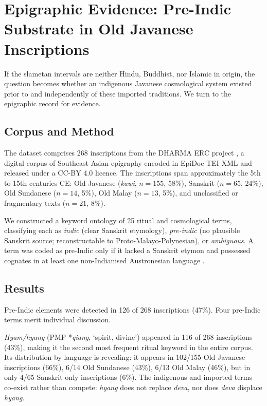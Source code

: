 \documentclass[12pt,a4paper]{article}
\begin{document}
\section{Epigraphic Evidence: Pre-Indic Substrate in Old Javanese Inscriptions}

If the slametan intervals are neither Hindu, Buddhist, nor Islamic in origin, the question becomes whether an indigenous Javanese cosmological system existed prior to and independently of these imported traditions. We turn to the epigraphic record for evidence.

\subsection{Corpus and Method}

The dataset comprises 268 inscriptions from the DHARMA ERC project \citep{griffiths_2020}, a digital corpus of Southeast Asian epigraphy encoded in EpiDoc TEI-XML and released under a CC-BY 4.0 licence. The inscriptions span approximately the 5th to 15th centuries CE: Old Javanese (\textit{kawi}, $n = 155$, 58\%), Sanskrit ($n = 65$, 24\%), Old Sundanese ($n = 14$, 5\%), Old Malay ($n = 13$, 5\%), and unclassified or fragmentary texts ($n = 21$, 8\%).

We constructed a keyword ontology of 25 ritual and cosmological terms, classifying each as \textit{indic} (clear Sanskrit etymology), \textit{pre-indic} (no plausible Sanskrit source; reconstructable to Proto-Malayo-Polynesian), or \textit{ambiguous}. A term was coded as pre-Indic only if it lacked a Sanskrit etymon and possessed cognates in at least one non-Indianised Austronesian language \citep{blust_trussel_2010}.

\subsection{Results}

Pre-Indic elements were detected in 126 of 268 inscriptions (47\%). Four pre-Indic terms merit individual discussion.

\textit{Hyam/hyang} (PMP *\textit{qiang}, `spirit, divine') appeared in 116 of 268 inscriptions (43\%), making it the second most frequent ritual keyword in the entire corpus. Its distribution by language is revealing: it appears in 102/155 Old Javanese inscriptions (66\%), 6/14 Old Sundanese (43\%), 6/13 Old Malay (46\%), but in only 4/65 Sanskrit-only inscriptions (6\%). The indigenous and imported terms co-exist rather than compete: \textit{hyang} does not replace \textit{deva}, nor does \textit{deva} displace \textit{hyang}.
\end{document}
